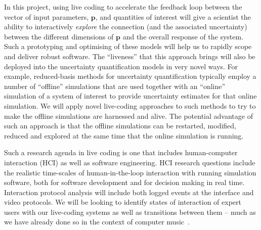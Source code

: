 In this project, using live coding to accelerate the feedback loop between the vector of input parameters,
$\mathbf{p}$,  and quantities of interest  will give a scientist the ability to interactively
\emph{explore} the connection (and the associated uncertainty) between
the different dimensions of $\mathbf{p}$ and the overall response of
the system. Such a prototyping and optimising of these models will help us to rapidly scope and deliver 
robust software. The ``liveness'' that this approach brings will also be deployed 
into the uncertainty quantification models in very novel ways. For example, reduced-basis methods for uncertainty 
quantification typically employ a number of ``offline'' simulations that are used together with an ``online'' simulation of 
a system of interest to provide uncertainty estimates for that online simulation. We will apply novel live-coding
approaches to such methods to try to make the offline simulations are harnessed and alive. The 
potential advantage of such an approach is that the offline simulations can be restarted, modified, reduced and 
explored at the same time that the online simulation is running.


Such a research agenda in live coding is one that 
includes human-computer interaction (HCI) as well as software engineering. HCI research questions include the realistic time-scales of 
human-in-the-loop interaction with running simulation software, both for software development and for decision making in real time.
Interaction protocol analysis will include both logged events at the interface and 
video protocols. We will be looking to identify states of interaction 
of expert users with our live-coding systems as well as transitions between them -- much as we have already done so in the 
context of computer music~\parencite{swift2014coding}.\\







